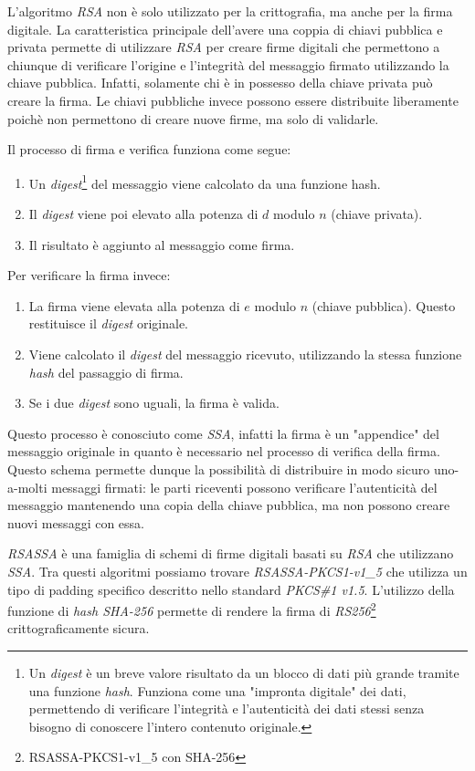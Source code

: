 L'algoritmo \emph{RSA} non è solo utilizzato per la crittografia, ma anche per la firma digitale.
La caratteristica principale dell'avere una coppia di chiavi pubblica e privata permette di utilizzare \emph{RSA} per creare firme digitali che permettono a chiunque di verificare l'origine e l'integrità del messaggio firmato utilizzando la chiave pubblica.
Infatti, solamente chi è in possesso della chiave privata può creare la firma.
Le chiavi pubbliche invece possono essere distribuite liberamente poichè non permettono di creare nuove firme, ma solo di validarle.

\noindent Il processo di firma e verifica funziona come segue:
\begin{enumerate}
	\item Un \emph{digest}\footnote{Un \emph{digest} è un breve valore risultato da un blocco di dati più grande tramite una funzione \emph{hash}. Funziona come una "impronta digitale" dei dati, permettendo di verificare l'integrità e l'autenticità dei dati stessi senza bisogno di conoscere l'intero contenuto originale.} del messaggio viene calcolato da una funzione hash.
	\item Il \emph{digest} viene poi elevato alla potenza di $d$ modulo $n$ (chiave privata).
	\item Il risultato è aggiunto al messaggio come firma.
\end{enumerate}
\noindent Per verificare la firma invece:
\begin{enumerate}
	\item La firma viene elevata alla potenza di $e$ modulo $n$ (chiave pubblica). Questo restituisce il \emph{digest} originale.
	\item Viene calcolato il \emph{digest} del messaggio ricevuto, utilizzando la stessa funzione \emph{hash} del passaggio di firma.
	\item Se i due \emph{digest} sono uguali, la firma è valida.
\end{enumerate}

Questo processo è conosciuto come \emph{\gls{SSA}}, infatti la firma è un "appendice" del messaggio originale in quanto è necessario nel processo di verifica della firma.
Questo schema permette dunque la possibilità di distribuire in modo sicuro uno-a-molti messaggi firmati: le parti riceventi possono verificare l'autenticità del messaggio mantenendo una copia della chiave pubblica, ma non possono creare nuovi messaggi con essa.

\emph{RSASSA} è una famiglia di schemi di firme digitali basati su \emph{RSA} che utilizzano \emph{SSA}.
Tra questi algoritmi possiamo trovare \emph{RSASSA-PKCS1-v1\_5} che utilizza un tipo di padding specifico descritto nello standard \emph{PKCS\#1 v1.5}.
L'utilizzo della funzione di \emph{hash SHA-256} permette di rendere la firma di \emph{RS256}\footnote{RSASSA-PKCS1-v1\_5 con SHA-256} crittograficamente sicura.

